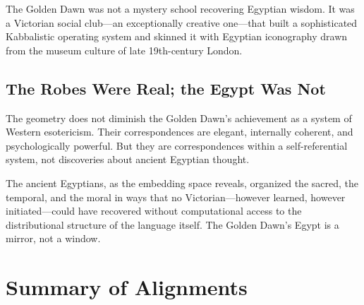 \documentclass[11pt, a4paper]{article}
\begin{document}
The Golden Dawn was not a mystery school recovering Egyptian wisdom. It was a Victorian social club---an exceptionally creative one---that built a sophisticated Kabbalistic operating system and skinned it with Egyptian iconography drawn from the museum culture of late 19th-century London.

\subsection{The Robes Were Real; the Egypt Was Not}

The geometry does not diminish the Golden Dawn's achievement as a system of Western esotericism. Their correspondences are elegant, internally coherent, and psychologically powerful. But they are correspondences within a self-referential system, not discoveries about ancient Egyptian thought.

The ancient Egyptians, as the embedding space reveals, organized the sacred, the temporal, and the moral in ways that no Victorian---however learned, however initiated---could have recovered without computational access to the distributional structure of the language itself. The Golden Dawn's Egypt is a mirror, not a window.

\section{Summary of Alignments}
\label{sec:summary}
\end{document}

